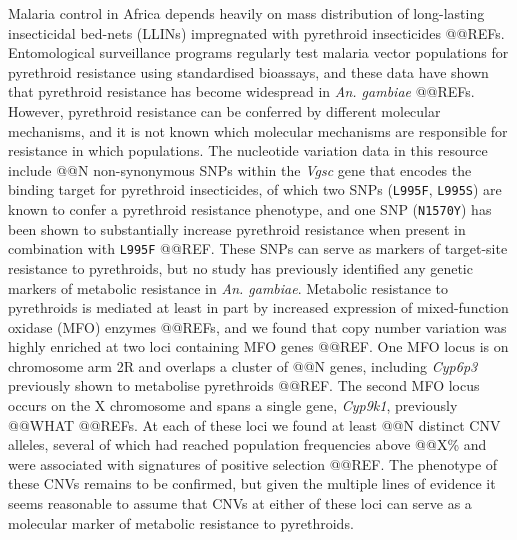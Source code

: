 \documentclass[a4paper,11pt,abstracton,hidelinks]{scrartcl}
\begin{document}
Malaria control in Africa depends heavily on mass distribution of long-lasting insecticidal bed-nets (LLINs) impregnated with pyrethroid insecticides @@REFs.
%
Entomological surveillance programs regularly test malaria vector populations for pyrethroid resistance using standardised bioassays, and these data have shown that pyrethroid resistance has become widespread in \textit{An. gambiae} @@REFs.
%
However, pyrethroid resistance can be conferred by different molecular mechanisms, and it is not known which molecular mechanisms are responsible for resistance in which populations.
%
The nucleotide variation data in this resource include @@N non-synonymous SNPs within the \textit{Vgsc} gene that encodes the binding target for pyrethroid insecticides, of which two SNPs (\texttt{L995F}, \texttt{L995S}) are known to confer a pyrethroid resistance phenotype, and one SNP (\texttt{N1570Y}) has been shown to substantially increase pyrethroid resistance when present in combination with \texttt{L995F} @@REF. 
%
These SNPs can serve as markers of target-site resistance to pyrethroids, but no study has previously identified any genetic markers of metabolic resistance in \textit{An. gambiae}.
%
Metabolic resistance to pyrethroids is mediated at least in part by increased expression of mixed-function oxidase (MFO) enzymes @@REFs, and we found that copy number variation was highly enriched at two loci containing MFO genes @@REF.
%
One MFO locus is on chromosome arm 2R and overlaps a cluster of @@N genes, including \textit{Cyp6p3} previously shown to metabolise pyrethroids @@REF.
%
The second MFO locus occurs on the X chromosome and spans a single gene, \textit{Cyp9k1}, previously @@WHAT @@REFs. 
%
At each of these loci we found at least @@N distinct CNV alleles, several of which had reached population frequencies above @@X\% and were associated with signatures of positive selection @@REF.
%
The phenotype of these CNVs remains to be confirmed, but given the multiple lines of evidence it seems reasonable to assume that CNVs at either of these loci can serve as a molecular marker of metabolic resistance to pyrethroids.
\end{document}
